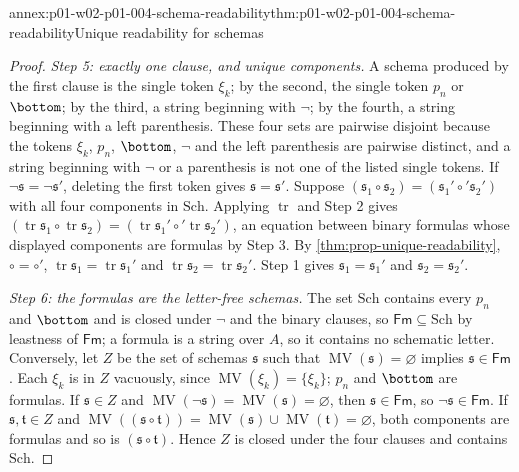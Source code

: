 \begin{annexitem}{annex:p01-w02-p01-004-schema-readability}{thm:p01-w02-p01-004-schema-readability}{Unique readability for schemas}
\begin{proof}
\emph{Step 5: exactly one clause, and unique components.} A schema produced
by the first clause is the single token \(\xi_k\); by the second, the single
token \(p_n\) or \(\bottom\); by the third, a string beginning with \(\neg\);
by the fourth, a string beginning with a left parenthesis. These four sets are
pairwise disjoint because the tokens \(\xi_k\), \(p_n\), \(\bottom\), \(\neg\)
and the left parenthesis are pairwise distinct, and a string beginning with
\(\neg\) or a parenthesis is not one of the listed single tokens. If
\(\neg\mathfrak s=\neg\mathfrak s'\), deleting the first token gives
\(\mathfrak s=\mathfrak s'\). Suppose
\((\mathfrak s_1\circ\mathfrak s_2)=(\mathfrak s_1'\circ'\mathfrak s_2')\) with
all four components in \(\mathrm{Sch}\). Applying \(\operatorname{tr}\) and
Step 2 gives
\((\operatorname{tr}\mathfrak s_1\circ\operatorname{tr}\mathfrak s_2)
=(\operatorname{tr}\mathfrak s_1'\circ'\operatorname{tr}\mathfrak s_2')\), an
equation between binary formulas whose displayed components are formulas by
Step 3. By \cref{thm:prop-unique-readability}, \(\circ=\circ'\),
\(\operatorname{tr}\mathfrak s_1=\operatorname{tr}\mathfrak s_1'\) and
\(\operatorname{tr}\mathfrak s_2=\operatorname{tr}\mathfrak s_2'\). Step 1
gives \(\mathfrak s_1=\mathfrak s_1'\) and \(\mathfrak s_2=\mathfrak s_2'\).

\emph{Step 6: the formulas are the letter-free schemas.} The set
\(\mathrm{Sch}\) contains every \(p_n\) and \(\bottom\) and is closed under
\(\neg\) and the binary clauses, so \(\mathsf{Fm}\subseteq\mathrm{Sch}\) by
leastness of \(\mathsf{Fm}\); a formula is a string over \(A\), so it contains
no schematic letter. Conversely, let \(Z\) be the set of schemas
\(\mathfrak s\) such that \(\operatorname{MV}(\mathfrak s)=\varnothing\)
implies \(\mathfrak s\in\mathsf{Fm}\). Each \(\xi_k\) is in \(Z\) vacuously,
since \(\operatorname{MV}(\xi_k)=\{\xi_k\}\); \(p_n\) and \(\bottom\) are
formulas. If \(\mathfrak s\in Z\) and
\(\operatorname{MV}(\neg\mathfrak s)=\operatorname{MV}(\mathfrak
s)=\varnothing\), then \(\mathfrak s\in\mathsf{Fm}\), so
\(\neg\mathfrak s\in\mathsf{Fm}\). If \(\mathfrak s,\mathfrak t\in Z\) and
\(\operatorname{MV}((\mathfrak s\circ\mathfrak t))=\operatorname{MV}(\mathfrak
s)\cup\operatorname{MV}(\mathfrak t)=\varnothing\), both components are
formulas and so is \((\mathfrak s\circ\mathfrak t)\). Hence \(Z\) is closed
under the four clauses and contains \(\mathrm{Sch}\).
\end{proof}
\end{annexitem}

